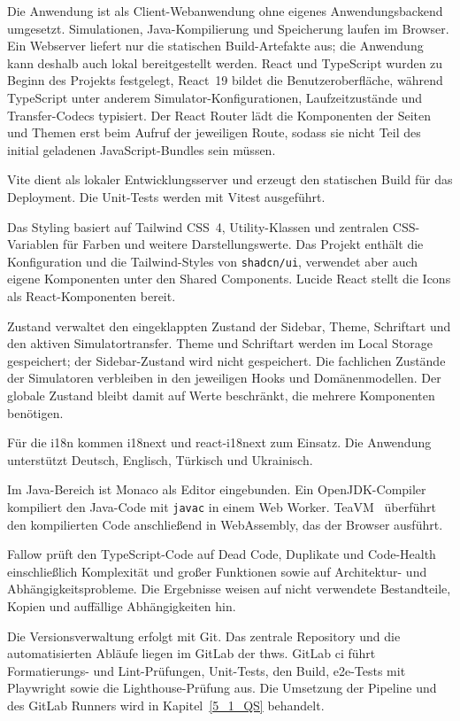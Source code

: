 
Die Anwendung ist als Client-Webanwendung ohne eigenes Anwendungsbackend umgesetzt. Simulationen, Java-Kompilierung und Speicherung laufen im Browser. Ein Webserver liefert nur die statischen Build-Artefakte aus; die Anwendung kann deshalb auch lokal bereitgestellt werden. React und TypeScript wurden zu Beginn des Projekts festgelegt, React~19 bildet die Benutzeroberfläche, während TypeScript unter anderem Simulator-Konfigurationen, Laufzeitzustände und Transfer-Codecs typisiert. Der React Router lädt die Komponenten der Seiten und Themen erst beim Aufruf der jeweiligen Route, sodass sie nicht Teil des initial geladenen JavaScript-Bundles sein müssen.

Vite dient als lokaler Entwicklungsserver und erzeugt den statischen Build für das Deployment. Die Unit-Tests werden mit Vitest ausgeführt.

Das Styling basiert auf Tailwind CSS~4, Utility-Klassen und zentralen CSS-Variablen für Farben und weitere Darstellungswerte. Das Projekt enthält die Konfiguration und die Tailwind-Styles von \verb|shadcn/ui|, verwendet aber auch eigene Komponenten unter den Shared Components. Lucide React stellt die Icons als React-Komponenten bereit.

Zustand verwaltet den eingeklappten Zustand der Sidebar, Theme, Schriftart und den aktiven Simulatortransfer. Theme und Schriftart werden im Local Storage gespeichert; der Sidebar-Zustand wird nicht gespeichert. Die fachlichen Zustände der Simulatoren verbleiben in den jeweiligen Hooks und Domänenmodellen. Der globale Zustand bleibt damit auf Werte beschränkt, die mehrere Komponenten benötigen.

Für die \acrlong{i18n} kommen i18next und react-i18next zum Einsatz. Die Anwendung unterstützt Deutsch, Englisch, Türkisch und Ukrainisch.

Im Java-Bereich ist Monaco als Editor eingebunden. Ein OpenJDK-Compiler kompiliert den Java-Code mit \verb|javac| in einem Web Worker. TeaVM~\cite{teavm} überführt den kompilierten Code anschließend in WebAssembly, das der Browser ausführt.

Fallow prüft den TypeScript-Code auf Dead Code, Duplikate und Code-Health einschließlich Komplexität und großer Funktionen sowie auf Architektur- und Abhängigkeitsprobleme. Die Ergebnisse weisen auf nicht verwendete Bestandteile, Kopien und auffällige Abhängigkeiten hin.

Die Versionsverwaltung erfolgt mit Git. Das zentrale Repository und die automatisierten Abläufe liegen im GitLab der \gls{thws}. GitLab \gls{ci} führt Formatierungs- und Lint-Prüfungen, Unit-Tests, den Build, \gls{e2e}-Tests mit Playwright sowie die Lighthouse-Prüfung aus. Die Umsetzung der Pipeline und des GitLab Runners wird in Kapitel~\ref{5_1_QS} behandelt.
